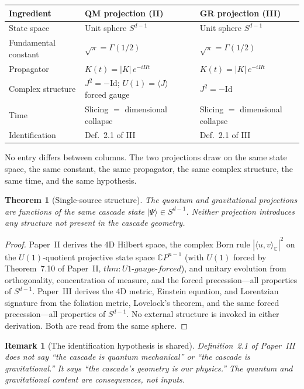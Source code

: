 \documentclass[12pt,a4paper]{article}
\newtheorem{theorem}{Theorem}[section]
\newtheorem*{remark}{Remark}
\begin{document}
\begin{center}
\begin{tabular}{lll}
\hline
Ingredient & QM projection (II) & GR projection (III) \\
\hline
State space & Unit sphere $S^{d-1}$ & Unit sphere $S^{d-1}$ \\
Fundamental constant & $\sqrt{\pi} = \Gamma(1/2)$ & $\sqrt{\pi} = \Gamma(1/2)$ \\
Propagator & $K(t) = |K|\,e^{-iHt}$ & $K(t) = |K|\,e^{-iHt}$ \\
Complex structure & $J^2 = -\mathrm{Id}$; $U(1) = \langle J\rangle$
                    forced gauge & $J^2 = -\mathrm{Id}$ \\
Time & Slicing $=$ dimensional collapse & Slicing $=$ dimensional collapse \\
Identification & Def.\ 2.1 of III & Def.\ 2.1 of III \\
\hline
\end{tabular}
\end{center}

No entry differs between columns. The two projections draw on the same state
space, the same constant, the same propagator, the same complex structure, the
same time, and the same hypothesis.

\begin{theorem}[Single-source structure]\label{thm:single}
The quantum and gravitational projections are functions of the same cascade
state $|\Psi\rangle \in S^{d-1}$. Neither projection introduces any structure
not present in the cascade geometry.
\end{theorem}

\begin{proof}
Paper~II derives the 4D Hilbert space, the complex Born rule
$|\langle u, v\rangle_\mathbb{C}|^2$ on the $U(1)$-quotient projective
state space $\mathbb{C}P^{n-1}$ (with $U(1)$ forced by Theorem~7.10 of
Paper~II, $\mathit{thm{:}U1{\text{-}}gauge{\text{-}}forced}$), and unitary
evolution from orthogonality, concentration of measure, and the forced
precession---all properties of $S^{d-1}$. Paper~III derives the 4D
metric, Einstein equation, and Lorentzian signature from the foliation
metric, Lovelock's theorem, and the same forced precession---all
properties of $S^{d-1}$. No external structure is invoked in either
derivation. Both are read from the same sphere.
\end{proof}

\begin{remark}[The identification hypothesis is shared]
Definition~2.1 of Paper~III does not say ``the cascade is quantum
mechanical'' or ``the cascade is gravitational.'' It says ``the cascade's
geometry is our physics.'' The quantum and gravitational content are
consequences, not inputs.
\end{remark}
\end{document}
